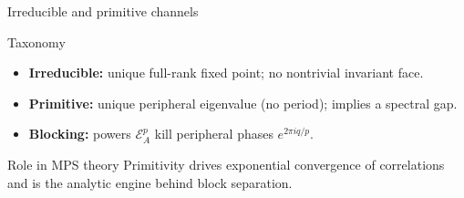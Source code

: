 \documentclass[aspectratio=169,10pt]{beamer}
\newcommand{\cE}{\mathcal{E}}
\begin{document}
\begin{frame}{Irreducible and primitive channels~\cite{Evans1978Spectral,Wolf2012Quantum}}
    \vspace{-0.6em}

    \begin{block}{Taxonomy}
        \begin{itemize}\itemsep0.25em
            \item \textbf{Irreducible:} unique full-rank fixed point; no nontrivial invariant face.
            \item \textbf{Primitive:} unique peripheral eigenvalue (no period); implies a spectral gap.
            \item \textbf{Blocking:} powers $\cE_A^p$ kill peripheral phases $e^{2\pi i q/p}$.
        \end{itemize}
    \end{block}

    \begin{block}{Role in MPS theory}
        Primitivity drives exponential convergence of correlations~\cite{Lancien2021Correlation}
        and is the analytic engine behind block separation.
    \end{block}
\end{frame}
\end{document}
